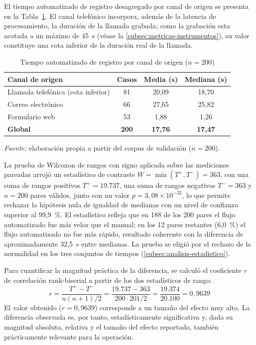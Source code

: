 El tiempo automatizado de registro desagregado por canal de origen se presenta en la Tabla~\ref{tab:tiempos-canal}. El canal telefónico incorpora, además de la latencia de procesamiento, la duración de la llamada grabada; como la grabación esta acotada a un máximo de 45~s (véase la \autoref{subsec:metricas-instrumentos}), su valor constituye una cota inferior de la duración real de la llamada.

\begin{table}[htbp]
\centering
\caption{Tiempo automatizado de registro por canal de origen (\(n = 200\))}
\label{tab:tiempos-canal}
\small
\begin{tabular}{@{}p{6.0cm} c c c@{}}
\toprule
\textbf{Canal de origen} & \textbf{Casos} & \textbf{Media (s)} & \textbf{Mediana (s)} \\
\midrule
Llamada telefónica (cota inferior) & 81 & 20,09 & 18,70 \\
Correo electrónico                 & 66 & 27,65 & 25,82 \\
Formulario web                     & 53 & 1,88  & 1,26  \\
\midrule
\textbf{Global}                    & \textbf{200} & \textbf{17,76} & \textbf{17,47} \\
\bottomrule
\end{tabular}
\par\smallskip
{\footnotesize\textit{Fuente:} elaboración propia a partir del corpus de validación (\(n = 200\)).\par}
\end{table}

La prueba de Wilcoxon de rangos con signo aplicada sobre las mediciones pareadas \parencite{Virtanen2020_scipy} arrojó un estadístico de contraste \(W = \min(T^{+}, T^{-}) = 363\), con una suma de rangos positivos \(T^{+} = 19.737\), una suma de rangos negativos \(T^{-} = 363\) y \(n = 200\) pares válidos, junto con un valor \(p = 3{,}08 \times 10^{-32}\), lo que permite rechazar la hipótesis nula de igualdad de medianas con un nivel de confianza superior al 99,9~\%. El estadístico refleja que en 188 de los 200 pares el flujo automatizado fue más veloz que el manual; en los 12 pares restantes (6,0~\%) el flujo automatizado no fue más rápido, resultado coherente con la diferencia de aproximadamente 32,5~s entre medianas. La prueba se eligió por el rechazo de la normalidad en los tres conjuntos de tiempos (\autoref{subsec:analisis-estadistico}).

Para cuantificar la magnitud práctica de la diferencia, se calculó el coeficiente \(r\) de correlación rank-biserial a partir de los dos estadísticos de rango:
\[
r = \frac{T^{+} - T^{-}}{n(n+1)/2} = \frac{19.737 - 363}{200 \cdot 201 / 2} = \frac{19.374}{20.100} = 0{,}9639
\]
El valor obtenido (\(r = 0{,}9639\)) corresponde a un tamaño del efecto muy alto. La diferencia observada es, por tanto, estadísticamente significativa y, dada su magnitud absoluta, relativa y el tamaño del efecto reportado, también prácticamente relevante para la operación.

